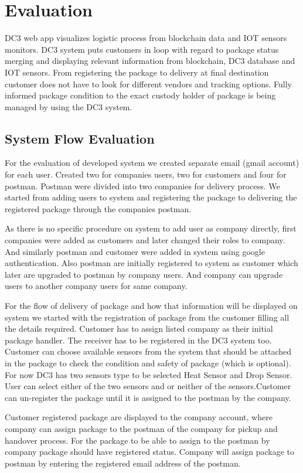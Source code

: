 \chapter{Evaluation}
\label{cha:evaluation}

DC3 web app visualizes logistic process from blockchain data and IOT sensors monitors. DC3 system puts customers in loop with regard to package status merging and displaying relevant information from blockchain, DC3 database and IOT sensors. From registering the package to delivery at final destination customer does not have to look for different vendors and tracking options. Fully informed package condition to the exact custody holder of package is being managed by using the DC3 system.
\section{System Flow Evaluation}
For the evaluation of developed system we created separate email (gmail account) for each user. Created two for companies users, two for customers and four for postman. Postman were divided into two companies for delivery process. We started from adding users to system and registering the package to delivering the registered package through the companies postman.

As there is no specific procedure on system to add user as company directly, first companies were added as customers and later changed their roles to company. And similarly postman and customer were added in system using google authentication. Also postman are initially registered to system as customer which later are upgraded to postman by company users. And company can upgrade users to another company users for same company.

For the flow of delivery of package and how that information will be displayed on system we started with the registration of package from the customer filling all the details required. Customer has to assign listed company as their initial package handler. The receiver has to be registered in the DC3 system too. Customer can choose available sensors from the system that should be attached in the package to check the condition and safety of package (which is optional). For now DC3 has two sensors type to be selected Heat Sensor and Drop Sensor. User can select either of the two sensors and or neither of the sensors.Customer can un-register the package until it is assigned to the postman by the company.

Customer registered package are displayed to the company account, where company can assign package to the postman of the company for pickup and handover process. For the package to be able to assign to the postman by company package should have registered status. Company will assign package to postman by entering the registered email address of the postman.

